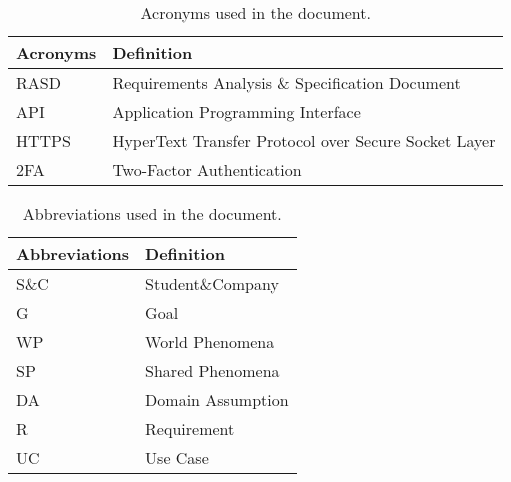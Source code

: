 \begin{table}[H]
    \begin{center}
        \begin{tabular}{ |l|l| }
            \hline
            \textbf{Acronyms} & \textbf{Definition}                              \\
            \hline
            RASD             & Requirements Analysis \& Specification Document   \\
            \hline
            API             & Application Programming Interface                  \\
            \hline
            HTTPS             & HyperText Transfer Protocol over Secure Socket Layer   \\
            \hline            
            2FA             &  Two-Factor Authentication \\
            \hline    
         \end{tabular}
        \caption{Acronyms used in the document.}
        \label{tab:acronyms}%
    \end{center}
\end{table}

\begin{table}[H]
    \begin{center}
        \begin{tabular}{ |l|l| }
            \hline
            \textbf{Abbreviations} & \textbf{Definition}
            \\
            \hline
            S\&C               & Student\&Company                     \\
            \hline
            G               & Goal                           \\
            \hline
            WP             & World Phenomena                          \\
            \hline
            SP             & Shared Phenomena                           \\
            \hline
            DA             & Domain Assumption                          \\
            \hline
            R              & Requirement                           \\
            \hline
            UC             & Use Case                           \\
            \hline
         \end{tabular}
        \caption{Abbreviations used in the document.}
        \label{tab:Abbreviations}%
    \end{center}
\end{table}

